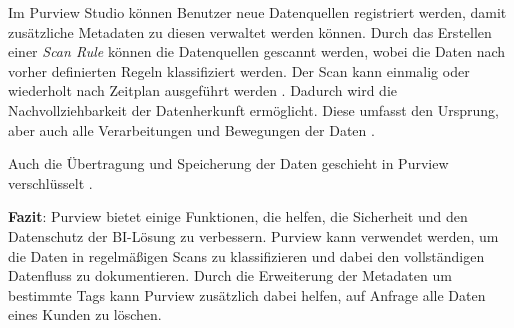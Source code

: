 Im Purview Studio können Benutzer neue Datenquellen registriert werden, damit zusätzliche Metadaten zu diesen verwaltet werden können. Durch das Erstellen einer \textit{Scan Rule} können die Datenquellen gescannt werden, wobei die Daten nach vorher definierten Regeln klassifiziert werden. Der Scan kann einmalig oder wiederholt nach Zeitplan ausgeführt werden \cite{lesteve_definitive_2021}. Dadurch wird die Nachvollziehbarkeit der Datenherkunft ermöglicht. Diese umfasst den Ursprung, aber auch alle Verarbeitungen und Bewegungen der Daten \cite{riscutia_data_2021}.

Auch die Übertragung und Speicherung der Daten geschieht in Purview verschlüsselt \cite{baldwin_azure_2021}. 

\textbf{Fazit}: Purview bietet einige Funktionen, die helfen, die Sicherheit und den Datenschutz der BI-Lösung zu verbessern. Purview kann verwendet werden, um die Daten in regelmäßigen Scans zu klassifizieren und dabei den vollständigen Datenfluss zu dokumentieren. Durch die Erweiterung der Metadaten um bestimmte Tags kann Purview zusätzlich dabei helfen, auf Anfrage alle Daten eines Kunden zu löschen.